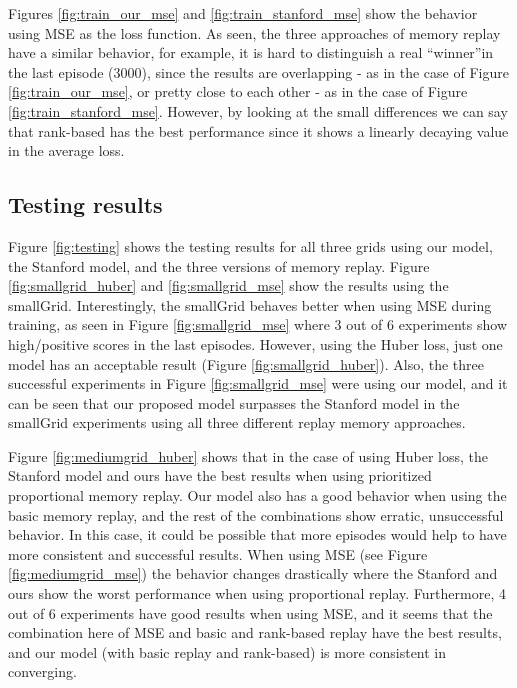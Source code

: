 \documentclass[conference]{IEEEtran}
\begin{document}
Figures \ref{fig:train_our_mse} and \ref{fig:train_stanford_mse} show the behavior using MSE as the loss function. As seen, the three approaches of memory replay have a similar behavior, for example, it is hard to distinguish a real ``winner''in the last episode (3000), since the results are overlapping - as in the case of Figure \ref{fig:train_our_mse}, or pretty close to each other - as in the case of Figure \ref{fig:train_stanford_mse}. However, by looking at the small differences we can say that rank-based has the best performance since it shows a linearly decaying value in the average loss.


\subsection{Testing results}

Figure \ref{fig:testing} shows the testing results for all three grids using our model, the Stanford model, and the three versions of memory replay. Figure \ref{fig:smallgrid_huber} and \ref{fig:smallgrid_mse} show the results using the smallGrid. Interestingly, the smallGrid behaves better when using MSE during training, as seen in Figure \ref{fig:smallgrid_mse} where 3 out of 6 experiments show high/positive scores in the last episodes. However, using the Huber loss, just one model has an acceptable result (Figure \ref{fig:smallgrid_huber}). Also, the three successful experiments in Figure \ref{fig:smallgrid_mse} were using our model, and it can be seen that our proposed model surpasses the Stanford model in the smallGrid experiments using all three different replay memory approaches.

Figure \ref{fig:mediumgrid_huber} shows that in the case of using Huber loss, the Stanford model and ours have the best results when using prioritized proportional memory replay. Our model also has a good behavior when using the basic memory replay, and the rest of the combinations show erratic, unsuccessful behavior. In this case, it could be possible that more episodes would help to have more consistent and successful results. When using MSE (see Figure \ref{fig:mediumgrid_mse}) the behavior changes drastically where the Stanford and ours show the worst performance when using proportional replay. Furthermore, 4 out of 6 experiments have good results when using MSE, and it seems that the combination here of MSE and basic and rank-based replay have the best results, and our model (with basic replay and rank-based) is more consistent in converging.
\end{document}
